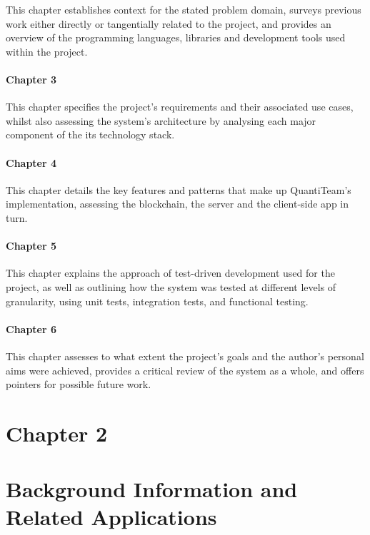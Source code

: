 \documentclass[12pt]{report}
\let\oldparagraph\paragraph
\renewcommand{\paragraph}[1]{\oldparagraph{#1}\mbox{}}
\begin{document}
This chapter establishes context for the stated problem domain, surveys
previous work either directly or tangentially related to the project,
and provides an overview of the programming languages, libraries and
development tools used within the project.

\paragraph{Chapter 3}\label{chapter-3}

This chapter specifies the project's requirements and their associated
use cases, whilst also assessing the system's architecture by analysing
each major component of the its technology stack.

\paragraph{Chapter 4}\label{chapter-4}

This chapter details the key features and patterns that make up
QuantiTeam's implementation, assessing the blockchain, the server and
the client-side app in turn.

\paragraph{Chapter 5}\label{chapter-5}

This chapter explains the approach of test-driven development used for
the project, as well as outlining how the system was tested at different
levels of granularity, using unit tests, integration tests, and
functional testing.

\paragraph{Chapter 6}\label{chapter-6}

This chapter assesses to what extent the project's goals and the
author's personal aims were achieved, provides a critical review of the
system as a whole, and offers pointers for possible future work.

\clearpage

\section{Chapter 2}\label{chapter-2-1}

\section{Background Information and Related
Applications}\label{background-information-and-related-applications}
\end{document}
